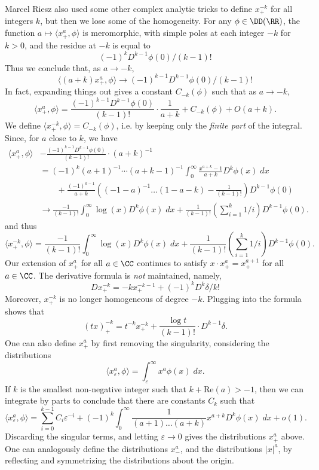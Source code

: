 \begin{example}
  Marcel Riesz also used some other complex analytic tricks to define $x^{-k}_+$ for all integers $k$, but then we lose some of the homogeneity. For any $\phi \in \DD(\RR)$, the function $a \mapsto \langle x^a_+, \phi \rangle$ is meromorphic, with simple poles at each integer $-k$ for $k > 0$, and the residue at $-k$ is equal to
  \[ (-1)^k D^{k-1} \phi(0) / (k-1)! \]
  Thus we conclude that, as $a \to -k$,
  \[ \langle (a + k) x^a_+, \phi \rangle \to (-1)^{k-1} D^{k-1} \phi(0) / (k-1)! \]
  In fact, expanding things out gives a constant $C_{-k}(\phi)$ such that as $a \to -k$,
  \[ \langle x^a_+, \phi \rangle = \frac{(-1)^{k-1} D^{k-1} \phi(0)}{(k-1)!} \cdot \frac{1}{a + k} + C_{-k}(\phi) + O(a+k). \]
  We define $\langle x^{-k}_+, \phi \rangle = C_{-k}(\phi)$, i.e. by keeping only the \emph{finite part} of the integral. Since, for $a$ close to $k$, we have
  \begin{align*} \langle x^a_+, \phi \rangle &- \frac{(-1)^{k-1} D^{k-1} \phi(0)}{(k-1)!} \cdot (a+k)^{-1}\\
  &= (-1)^k (a+1)^{-1} \cdots (a+k-1)^{-1} \int_0^\infty \frac{x^{a + k} - 1}{a+k} D^k \phi(x)\; dx\\
  &\quad\quad + \frac{(-1)^{k-1}}{a+k} \left( (-1-a)^{-1} \dots (1-a-k) - \frac{1}{(k-1)!} \right) D^{k-1} \phi(0)\\
  &\to \frac{-1}{(k-1)!} \int_0^\infty \log(x) D^k \phi(x)\; dx + \frac{1}{(k-1)!} \left(\sum_{i = 1}^k 1/i \right) D^{k-1} \phi(0).
  \end{align*}
  and thus
  \[ \langle x^{-k}_+, \phi \rangle = \frac{-1}{(k-1)!} \int_0^\infty \log(x) D^k \phi(x)\; dx + \frac{1}{(k-1)!} \left(\sum_{i = 1}^k 1/i \right) D^{k-1} \phi(0). \]
  Our extension of $x^a_+$ for all $a \in \CC$ continues to satisfy $x \cdot x^a_+ = x^{a+1}_+$ for all $a \in \CC$. The derivative formula is \emph{not} maintained, namely,
  \[ D x^{-k}_+ = -k x^{-k-1}_+ + (-1)^k D^k \delta / k! \]
  Moreover, $x^{-k}_+$ is no longer homogeneous of degree $-k$. Plugging into the formula shows that
  \[ (tx)^{-k}_+ = t^{-k} x^{-k}_+ + \frac{\log t}{(k-1)!} \cdot D^{k-1} \delta. \]
  One can also define $x^a_+$ by first removing the singularity, considering the distributions
  \[ \langle x^a_\varepsilon, \phi \rangle = \int_\varepsilon^\infty x^a \phi(x)\; dx. \]
  If $k$ is the smallest non-negative integer such that $k + \text{Re}(a) > -1$, then we can integrate by parts to conclude that there are constants $C_k$ such that
  \[ \langle x^a_\varepsilon, \phi \rangle = \sum_{i = 0}^{k-1} C_i \varepsilon^{-i} + (-1)^k \int_0^\infty \frac{1}{(a+1) \dots (a+k)} x^{a + k} D^k \phi(x)\; dx + o(1). \]
  Discarding the singular terms, and letting $\varepsilon \to 0$ gives the distributions $x^a_+$ above. One can analogously define the distributions $x^a_-$, and the distributions $|x|^a$, by reflecting and symmetrizing the distributions about the origin.
\end{example}

